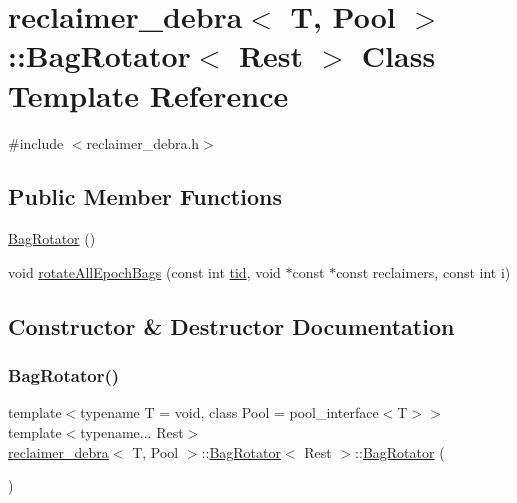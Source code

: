\hypertarget{classreclaimer__debra_1_1BagRotator}{}\section{reclaimer\+\_\+debra$<$ T, Pool $>$\+:\+:Bag\+Rotator$<$ Rest $>$ Class Template Reference}
\label{classreclaimer__debra_1_1BagRotator}


{\ttfamily \#include $<$reclaimer\+\_\+debra.\+h$>$}

\subsection*{Public Member Functions}
\begin{DoxyCompactItemize}
\item 
\hyperlink{classreclaimer__debra_1_1BagRotator_a7725117fdf881bd1222a5132f047b5ad}{Bag\+Rotator} ()
\item 
void \hyperlink{classreclaimer__debra_1_1BagRotator_afbddb968a51d703a13397031aa69bc42}{rotate\+All\+Epoch\+Bags} (const int \hyperlink{microbench_2main_8cpp_a9ca9869868fe7e7a38a921cc7de4103f}{tid}, void $\ast$const $\ast$const reclaimers, const int i)
\end{DoxyCompactItemize}


\subsection{Constructor \& Destructor Documentation}
\mbox{\label{classreclaimer__debra_1_1BagRotator_a7725117fdf881bd1222a5132f047b5ad}} 
\subsubsection{\texorpdfstring{Bag\+Rotator()}{BagRotator()}}
{\footnotesize\ttfamily template$<$typename T  = void, class Pool  = pool\+\_\+interface$<$\+T$>$$>$ \\
template$<$typename... Rest$>$ \\
\hyperlink{classreclaimer__debra}{reclaimer\+\_\+debra}$<$ T, Pool $>$\+::\hyperlink{classreclaimer__debra_1_1BagRotator}{Bag\+Rotator}$<$ Rest $>$\+::\hyperlink{classreclaimer__debra_1_1BagRotator}{Bag\+Rotator} (\begin{DoxyParamCaption}{ }\end{DoxyParamCaption})\hspace{0.3cm}{\ttfamily [inline]}}



